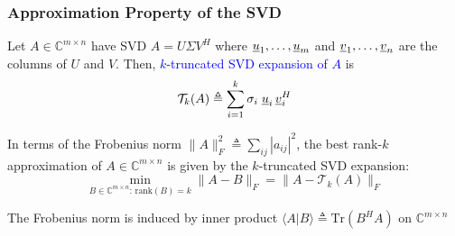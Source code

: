 \documentclass[10pt,english,aspectratio=169]{beamer}
\begin{document}
\begin{frame} \frametitle{Approximation Property of the SVD}

\begin{definition}
Let $A \in \mathbb{C}^{m\times n}$ have SVD $A=U \Sigma V^H$ where $\underline{u}_1,\ldots,\underline{u}_m$ and $\underline{v}_1,\ldots,\underline{v}_n$ are the columns of $U$ and $V$.
Then, \textcolor{blue}{$k$-truncated SVD expansion of $A$} is \vspace{-2mm}
\[ \mathcal{T}_k (A) \triangleq \sum_{i=1}^k \sigma_i \; \underline{u}_i \, \underline{v}_i^H \]
\end{definition}

\vspace{2mm}

\begin{theorem}
In terms of the Frobenius norm $\| A \|_F^2 \triangleq \sum_{ij} |a_{ij}|^2$, the best rank-$k$ approximation of $A \in \mathbb{C}^{m\times n}$ is given by the $k$-truncated SVD expansion: \vspace{-2mm}
\[ \min_{B \in \mathbb{C}^{m\times n}: \, \text{rank}(B)=k} \| A - B \|_F  = \| A - \mathcal{T}_k (A) \|_F \]
\end{theorem}

\vspace{2mm}

The Frobenius norm is induced by inner product $\langle A | B \rangle \triangleq \text{Tr} (B^H A)$ on $\mathbb{C}^{m \times n}$  
\end{frame}
\end{document}
